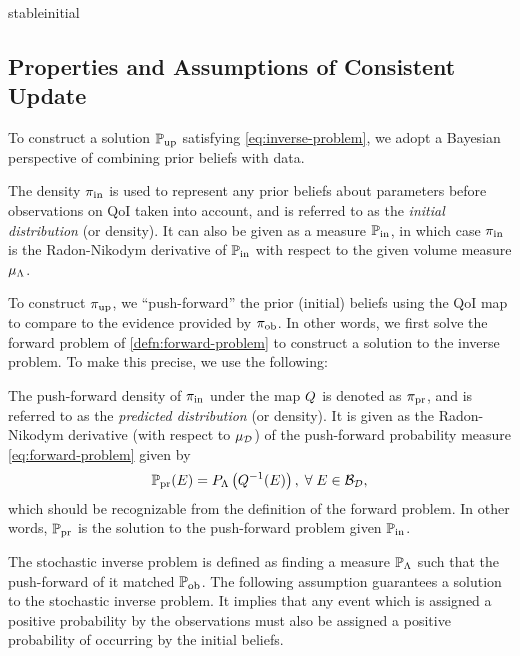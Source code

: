 stableinitial\subsection{Properties and Assumptions of Consistent Update}\label{sec:properties}

To construct a solution $\operatorname*{\mathbb{P}_{up}}$ satisfying \eqref{eq:inverse-problem}, we adopt a Bayesian perspective of combining prior beliefs with data. 

\begin{defn}\label{defn:initial}
  The density $\operatorname*{\pi_{in}}$ is used to represent any prior beliefs about parameters before observations on QoI taken into account, and is referred to as the \emph{initial distribution} (or density).
  It can also be given as a measure $\operatorname*{\mathbb{P}_{in}}$, in which case $\operatorname*{\pi_{in}}$ is the Radon-Nikodym derivative of $\operatorname*{\mathbb{P}_{in}}$ with respect to the given volume measure $\mu_{{\Lambda}}$. 
\end{defn}

To construct $\operatorname*{\pi_{up}}$, we ``push-forward'' the prior (initial) beliefs using the QoI map to compare to the evidence provided by $\operatorname*{\pi_{ob}}$. 
In other words, we first solve the forward problem of \eqref{defn:forward-problem} to construct a solution to the inverse problem. 
To make this precise, we use the following:

\begin{defn}\label{defn:predicted}
  The push-forward density of $\operatorname*{\pi_{in}}$ under the map $Q$ is denoted as $\operatorname*{\pi_{pr}}$, and is referred to as the \emph{predicted distribution} (or density). 
  It is given as the Radon-Nikodym derivative (with respect to $\mu_{\mathcal{D}}$) of the push-forward probability measure \eqref{eq:forward-problem} given by 
  \begin{equation}\label{eq:predicted}
    \operatorname*{\mathbb{P}_{pr}} (E) = P_{\Lambda} \left ( Q^{-1}(E) \right ), \; \forall \; E \in \mathcal{B}_{\mathcal{D}},
  \end{equation}
  which should be recognizable from the definition of the forward problem. 
  In other words, $\operatorname*{\mathbb{P}_{pr}}$ is the solution to the push-forward problem given $\operatorname*{\mathbb{P}_{in}}$.
\end{defn}


The stochastic inverse problem is defined as finding a measure $\mathbb{P}_{\Lambda}$ such that the push-forward of it matched $\operatorname*{\mathbb{P}_{ob}}$.
The following assumption guarantees a solution to the stochastic inverse problem. 
It implies that any event which is assigned a positive probability by the observations must also be assigned a positive probability of occurring by the initial beliefs. 

